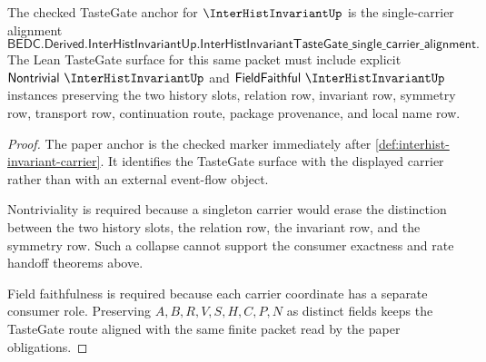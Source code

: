 \begin{theorem}
\label{thm:interhist-invariant-tastegate-field-contract}
The checked TasteGate anchor for $\InterHistInvariantUp$ is the single-carrier alignment
$$
\mathsf{BEDC.Derived.InterHistInvariantUp.InterHistInvariantTasteGate\_single\_carrier\_alignment}.
$$
The Lean TasteGate surface for this same packet must include explicit $\mathsf{Nontrivial}\ \InterHistInvariantUp$ and $\mathsf{FieldFaithful}\ \InterHistInvariantUp$ instances preserving the two history slots, relation row, invariant row, symmetry row, transport row, continuation route, package provenance, and local name row.
\end{theorem}
\begin{proof}
The paper anchor is the checked marker immediately after \autoref{def:interhist-invariant-carrier}. It identifies the TasteGate surface with the displayed carrier rather than with an external event-flow object.

Nontriviality is required because a singleton carrier would erase the distinction between the two history slots, the relation row, the invariant row, and the symmetry row. Such a collapse cannot support the consumer exactness and rate handoff theorems above.

Field faithfulness is required because each carrier coordinate has a separate consumer role. Preserving $A,B,R,V,S,H,C,P,N$ as distinct fields keeps the TasteGate route aligned with the same finite packet read by the paper obligations.
\end{proof}

